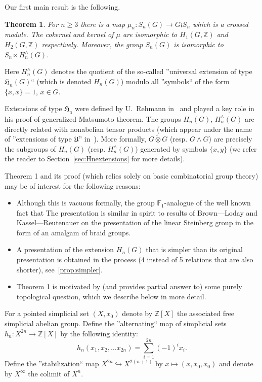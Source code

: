 \documentclass[oneside, 10pt]{amsart}
\theoremstyle{plain}
\newtheorem{thm}{Theorem}
\numberwithin{equation}{section}
\numberwithin{lemma}{section}
\theoremstyle{remark}
\theoremstyle{definition}
\newcommand{\ZZ}{\mathbb{Z}}
\begin{document}
Our first main result is the following. 
\begin{thm} \label{thm:summary} For $n \geq 3$ there is a map $\mu_n\colon S_n(G) \to G \wr S_n$ which is a crossed module.
The cokernel and kernel of $\mu$ are isomorphic to $H_1(G, \ZZ)$ and $H_2(G, \ZZ)$ respectively.
Moreover, the group $S_n(G)$ is isomorphic to $S_n \ltimes H_n^\wedge(G)$. \end{thm}
Here $H_n^\wedge(G)$ denotes the quotient of the so-called ''universal extension of type $\mathfrak{H}_n(G)$`` (which is denoted $H_n(G)$) 
modulo all ''symbols`` of the form $\{x, x\} = 1$, $x\in G$.

Extensions of type $\mathfrak{H_n}$ were defined by U.~Rehmann in~\cite{Reh78} and played a key role
 in his proof of generalized Matsumoto theorem.
The groups $H_n(G)$, $H_n^\wedge(G)$ are directly related with nonabelian tensor products 
 (which appear under the name of ''extensions of type $\mathfrak{U}$'' in~\cite{Reh78}). 
More formally,  $G \mathbin{\widetilde{\otimes}} G$ (resp. $G \wedge G$) are precisely the subgroups of 
 $H_n(G)$ (resp. $H_n^\wedge(G)$) generated by symbols $\{x, y\}$ (we refer the reader to Section~\ref{sec:Hnextensions} for more details).
 
Theorem 1 and its proof (which relies solely on basic combinatorial group theory) may be of interest for the following reasons:
\begin{itemize}
 \item Although this is vacuous formally, the group $\mathbb{F}_1$-analogue of the well known fact that 
       The presentation is similar in spirit to results of Brown---Loday and Kassel---Reutenauer on the presentation of the linear Steinberg group in the form of an amalgam of braid groups.
 \item A presentation of the extension $H_n(G)$ that is simpler than its original presentation is obtained in the process
       (4 instead of 5 relations that are also shorter), see~\cref{prop:simpler}.
 \item Theorem 1 is motivated by (and provides partial answer to) some purely topological question, which we describe below in more detail.
\end{itemize}

For a pointed simplicial set $(X, x_0)$ denote by $\ZZ[X]$ the associated free simplicial abelian group.
Define the ''alternating`` map of simplicial sets $h_n\colon X^{2n} \to \ZZ[X]$ by the following identity:
 \[h_n(x_1, x_2, \ldots x_{2n}) = \sum\limits_{i=1}^{2n}(-1)^ix_i.\]
Define the ''stabilization`` map $X^{2n} \hookrightarrow X^{2(n+1)}$ by $x \mapsto (x, x_0, x_0)$ and denote by $X^\infty$ the colimit of $X^n$.
\end{document}
